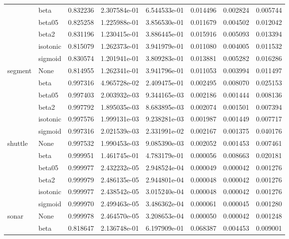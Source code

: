 \begin{tabular}{llrrrrrr}
        & beta &  0.832236 &  2.307584e-01 &  6.544533e-01 &  0.014496 &  0.002824 &  0.005744 \\
        & beta05 &  0.825258 &  1.225988e-01 &  3.856530e-01 &  0.011679 &  0.004502 &  0.012042 \\
        & beta2 &  0.831196 &  1.230415e-01 &  3.886445e-01 &  0.015916 &  0.005093 &  0.013394 \\
        & isotonic &  0.815079 &  1.262373e-01 &  3.941979e-01 &  0.011080 &  0.004005 &  0.011532 \\
        & sigmoid &  0.830574 &  1.201941e-01 &  3.809283e-01 &  0.013881 &  0.005282 &  0.016286 \\
segment & None &  0.814955 &  1.262341e-01 &  3.941796e-01 &  0.011053 &  0.003994 &  0.011497 \\
        & beta &  0.997316 &  4.965728e-02 &  2.409475e-01 &  0.002495 &  0.008070 &  0.025153 \\
        & beta05 &  0.997403 &  2.003932e-03 &  9.344165e-03 &  0.002186 &  0.001444 &  0.008136 \\
        & beta2 &  0.997792 &  1.895035e-03 &  8.683895e-03 &  0.002074 &  0.001501 &  0.007394 \\
        & isotonic &  0.997576 &  1.999131e-03 &  9.238281e-03 &  0.001987 &  0.001449 &  0.007717 \\
        & sigmoid &  0.997316 &  2.021539e-03 &  2.331991e-02 &  0.002167 &  0.001375 &  0.040176 \\
shuttle & None &  0.997532 &  1.990453e-03 &  9.085390e-03 &  0.002052 &  0.001453 &  0.007461 \\
        & beta &  0.999951 &  1.461745e-01 &  4.783179e-01 &  0.000056 &  0.008663 &  0.020181 \\
        & beta05 &  0.999977 &  2.432232e-05 &  2.948524e-04 &  0.000049 &  0.000042 &  0.001276 \\
        & beta2 &  0.999979 &  2.486135e-05 &  2.944801e-04 &  0.000048 &  0.000042 &  0.001276 \\
        & isotonic &  0.999977 &  2.438542e-05 &  3.015240e-04 &  0.000048 &  0.000042 &  0.001276 \\
        & sigmoid &  0.999970 &  2.499463e-05 &  3.486362e-04 &  0.000061 &  0.000045 &  0.001280 \\
sonar & None &  0.999978 &  2.464570e-05 &  3.208653e-04 &  0.000050 &  0.000042 &  0.001248 \\
        & beta &  0.818647 &  2.136748e-01 &  6.197909e-01 &  0.068387 &  0.004453 &  0.009001 \\

\end{tabular}

